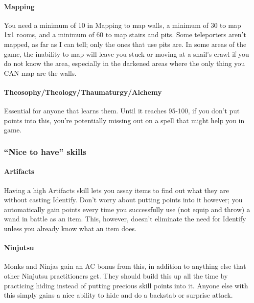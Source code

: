 \documentclass[12pt]{article}
\let\oldparagraph\paragraph
\renewcommand{\paragraph}[1]{\oldparagraph{#1}\mbox{}}
\newcommand{\indexSpell}[1]{\index{#1}}
\newcommand{\spell}[1]{#1\indexSpell{#1}}
\begin{document}
\paragraph{Mapping} You need a minimum of 10 in Mapping to map walls, a
minimum of 30 to map 1x1 rooms, and a minimum of 60 to map stairs and
pits. Some teleporters aren't mapped, as far as I can tell; only the ones
that use pits are. In some areas of the game, the inability to map will leave
you stuck or moving at a snail's crawl if you do not know the area,
especially in the darkened areas where the only thing you CAN map are the
walls.

\paragraph{Theosophy\fshyp{}Theology\fshyp{}Thaumaturgy\fshyp{}Alchemy}
Essential for anyone that learns them. Until it reaches 95-100, if you don't
put points into this, you're potentially missing out on a spell that might
help you in game.

\subsubsection{\texorpdfstring{``Nice to have''
skills}{Nice to have skills}}\label{nice-to-have-skills}

\paragraph{Artifacts} Having a high Artifacts skill lets you assay items to
find out what they are without casting \spell{Identify}. Don't worry about
putting points into it however; you automatically gain points every time you
successfully use (not equip and throw) a wand in battle as an item.  This,
however, doesn't eliminate the need for \spell{Identify} unless you already
know what an item does.

\paragraph{Ninjutsu} Monks and Ninjas gain an AC bonus from this, in addition
to anything else that other Ninjutsu practitioners get. They should build
this up all the time by practicing hiding instead of putting precious skill
points into it. Anyone else with this simply gains a nice ability to hide and
do a backstab or surprise attack.
\end{document}
